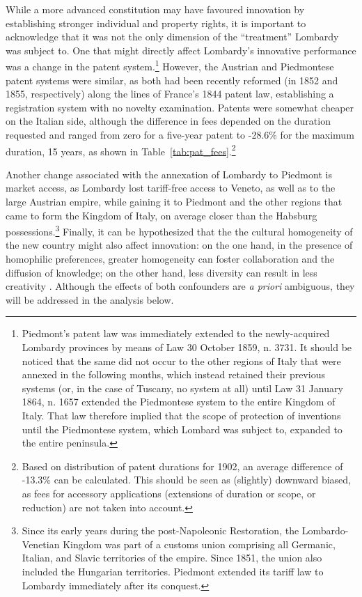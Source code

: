 While a more advanced constitution may have favoured innovation by establishing stronger individual and property rights, it is important to acknowledge that it was not the only dimension of the ``treatment'' Lombardy was subject to. One that might directly affect Lombardy's innovative performance was a change in the patent system.\footnote{
Piedmont's patent law was immediately extended to the newly-acquired Lombardy provinces by means of Law 30 October 1859, n. 3731. It should be noticed that the same did not occur to the other regions of Italy that were annexed in the following months, which instead retained their previous systems (or, in the case of Tuscany, no system at all) until Law 31 January 1864, n. 1657 extended the Piedmontese system to the entire Kingdom of Italy. That law therefore implied that the scope of protection of inventions until the Piedmontese system, which Lombard was subject to, expanded to the entire peninsula.
}
However, the Austrian and Piedmontese patent systems were similar, as both had been recently reformed (in 1852 and 1855, respectively) along the lines of France's 1844 patent law, establishing a registration system with no novelty examination.
Patents were somewhat cheaper on the Italian side, although the difference in fees depended on the duration requested and ranged from zero for a five-year patent to -28.6\% for the maximum duration, 15 years, as shown in Table~\ref{tab:pat_fees}.\footnote{Based on distribution of patent durations for 1902, an average difference of -13.3\% can be calculated. This should be seen as (slightly) downward biased, as fees for accessory applications (extensions of duration or scope, or reduction) are not taken into account.
}



Another change associated with the annexation of Lombardy to Piedmont is market access, as Lombardy lost tariff-free access to Veneto, as well as to the large Austrian empire, while gaining it to Piedmont and the other regions that came to form the Kingdom of Italy, on average closer than the Habsburg possessions.\footnote{Since its early years during the post-Napoleonic Restoration, the Lombardo-Venetian Kingdom was part of a customs union comprising all Germanic, Italian, and Slavic territories of the empire. Since 1851, the union also included the Hungarian territories. Piedmont extended its tariff law to Lombardy immediately after its conquest.
}
Finally, it can be hypothesized that the the cultural homogeneity of the new country might also affect innovation: on the one hand, in the presence of homophilic preferences, greater homogeneity can foster collaboration and the diffusion of knowledge; on the other hand, less diversity can result in less creativity \citep{ertug2022, mokyr2024}. 
Although the effects of both confounders are \textit{ a priori} ambiguous, they will be addressed in the analysis below.


